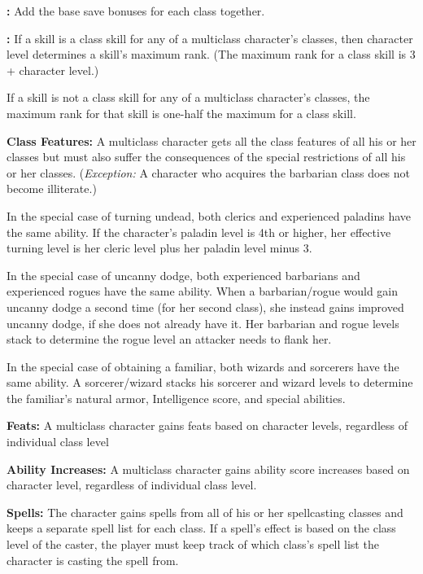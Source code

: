 \textbf{:} Add the base save bonuses for each class together.

\textbf{:} If a skill is a class skill for any of a multiclass character's 
classes, then character level determines a skill's maximum rank. (The maximum rank 
for a class skill is 3 + character level.)

If a skill is not a class skill for any of a multiclass character's classes, the 
maximum rank for that skill is one-half the maximum for a class skill.

\textbf{Class Features:} A multiclass character gets all the class features of 
all his or her classes but must also suffer the consequences of the special restrictions 
of all his or her classes. (\textit{Exception:} A character who acquires the barbarian 
class does not become illiterate.) 

In the special case of turning undead, both clerics and experienced paladins have 
the same ability. If the character's paladin level is 4th or higher, her effective 
turning level is her cleric level plus her paladin level minus 3. 

In the special case of uncanny dodge, both experienced barbarians and experienced 
rogues have the same ability. When a barbarian/rogue would gain uncanny dodge a 
second time (for her second class), she instead gains improved uncanny dodge, if 
she does not already have it. Her barbarian and rogue levels stack to determine 
the rogue level an attacker needs to flank her. 

In the special case of obtaining a familiar, both wizards and sorcerers have the 
same ability. A sorcerer/wizard stacks his sorcerer and wizard levels to determine 
the familiar's natural armor, Intelligence score, and special abilities.

\textbf{Feats:} A multiclass character gains feats based on character levels, regardless 
of individual class level

\textbf{Ability Increases:} A multiclass character gains ability score increases 
based on character level, regardless of individual class level.

\textbf{Spells:} The character gains spells from all of his or her spellcasting 
classes and keeps a separate spell list for each class. If a spell's effect is 
based on the class level of the caster, the player must keep track of which class's 
spell list the character is casting the spell from.

